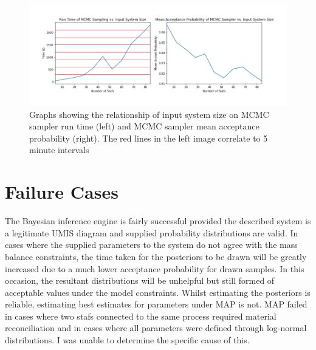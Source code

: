 \documentclass[ %
                    author={Tom Jager},
                supervisor={Dr. Daniel Schien},
                    degree={MEng},
                     title={A Bayesian Inference Engine for Calibrating Uncertainty over UMIS Structured MFA Systems},
                  subtitle={},
                      type={research},
                      year={2019} ]{dissertation}
\begin{document}
\begin{figure}
    \centering
    \includegraphics{images/performance_graphs.png}
    \caption{Graphs showing the relationship of input system size on MCMC sampler run time (left) and MCMC sampler mean acceptance probability (right). The red lines in the left image correlate to 5 minute intervals}
    \label{fig:performance_graph}
\end{figure}


\section{Failure Cases}
The Bayesian inference engine is fairly successful provided the described system is a legitimate UMIS diagram and supplied probability distributions are valid. In cases where the supplied parameters to the system do not agree with the mass balance constraints, the time taken for the posteriors to be drawn will be greatly increased due to a much lower acceptance probability for drawn samples. In this occasion, the resultant distributions will be unhelpful but still formed of acceptable values under the model constraints. Whilst estimating the posteriors is reliable, estimating best estimates for parameters under MAP is not. MAP failed in cases where two stafs connected to the same process required material reconciliation and in cases where all parameters were defined through log-normal distributions. I was unable to determine the specific cause of this.
\end{document}
